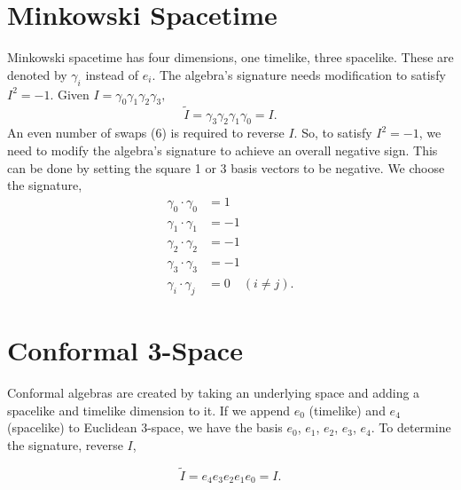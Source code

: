 	\section{Minkowski Spacetime}
	
	Minkowski spacetime has four dimensions, one timelike, three spacelike. These are denoted by $\gamma_i$ instead of $e_i$. The algebra's signature needs modification to satisfy $I^2 = -1$. Given $I = \gamma_0\gamma_1\gamma_2\gamma_3,$
	\[
	\tilde{I} = \gamma_3\gamma_2\gamma_1\gamma_0 = I.
	\]
	An even number of swaps (6) is required to reverse $I$. So, to satisfy $I^2=-1$, we need to modify the algebra's signature to achieve an overall negative sign. This can be done by setting the square 1 or 3 basis vectors to be negative. We choose the signature,
	\begin{align*}
	\gamma_0 \cdot \gamma_0 & = 1\\
	\gamma_1 \cdot \gamma_1 & = -1\\
	\gamma_2 \cdot \gamma_2 & = -1\\		
	\gamma_3 \cdot \gamma_3 & = -1\\
	\gamma_i \cdot \gamma_j & = 0 \quad \left(i\neq j\right).
	\end{align*}
	
	\section{Conformal 3-Space}
	
	Conformal algebras are created by taking an underlying space and adding a spacelike and timelike dimension to it. If we append $e_0$ (timelike) and $e_4$ (spacelike) to Euclidean 3-space, we have the basis $e_0$, $e_1$, $e_2$, $e_3$, $e_4$. To determine the signature, reverse $I$,
	  
	\[
	\tilde{I} = e_4e_3e_2e_1e_0 = I.
	\]
		
